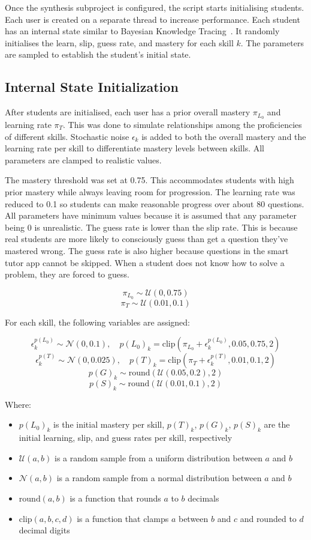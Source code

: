 Once the synthesis subproject is configured, the script starts initialising students. Each user is created on a separate thread to increase performance. Each student has an internal state similar to Bayesian Knowledge Tracing~\autocite{bkt}. It randomly initialises the learn, slip, guess rate, and mastery for each skill $k$. The parameters are sampled to establish the student's initial state.

\subsection{Internal State Initialization}

After students are initialised, each user has a prior overall mastery $\pi_{L_0}$ and learning rate $\pi_T$. This was done to simulate relationships among the proficiencies of different skills. Stochastic noise $\epsilon_k$ is added to both the overall mastery and the learning rate per skill to differentiate mastery levels between skills. All parameters are clamped to realistic values.

The mastery threshold was set at 0.75. This accommodates students with high prior mastery while always leaving room for progression. The learning rate was reduced to 0.1 so students can make reasonable progress over about 80 questions. All parameters have minimum values because it is assumed that any parameter being 0 is unrealistic. The guess rate is lower than the slip rate. This is because real students are more likely to consciously guess than get a question they've mastered wrong. The guess rate is also higher because questions in the smart tutor app cannot be skipped. When a student does not know how to solve a problem, they are forced to guess.

\[\pi_{L_0} \sim \mathcal{U}(0, 0.75)\]
\[\pi_T \sim \mathcal{U}(0.01, 0.1)\]

For each skill, the following variables are assigned:

\[ \epsilon_k^{p(L_0)} \sim \mathcal{N}(0, 0.1), \quad {p(L_0)}_k = \mathrm{clip}(\pi_{L_0} + \epsilon_k^{p(L_0)}, 0.05, 0.75, 2)\]
\[ \epsilon_k^{p(T)} \sim \mathcal{N}(0, 0.025), \quad {p(T)}_k = \mathrm{clip}(\pi_T + \epsilon_k^{p(T)}, 0.01, 0.1, 2)\]
\[ {p(G)}_k \sim \mathrm{round}(\mathcal{U}(0.05, 0.2), 2)\]
\[ {p(S)}_k \sim \mathrm{round}(\mathcal{U}(0.01, 0.1), 2)\]

Where:
\begin{itemize}
    \item ${p(L_0)}_k$ is the initial mastery per skill, ${p(T)}_k$, ${p(G)}_k$, ${p(S)}_k$ are the initial learning, slip, and guess rates per skill, respectively
    \item $\mathcal{U}(a, b)$ is a random sample from a uniform distribution between $a$ and $b$
    \item $\mathcal{N}(a, b)$ is a random sample from a normal distribution between $a$ and $b$
    \item $\mathrm{round}(a, b)$ is a function that rounds $a$ to $b$ decimals
    \item $\mathrm{clip}(a, b, c, d)$ is a function that clamps $a$ between $b$ and $c$ and rounded to $d$ decimal digits
\end{itemize}

